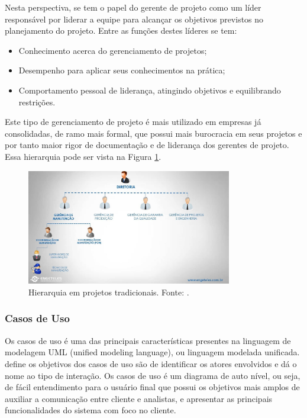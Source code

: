 Nesta perspectiva, se tem o papel do gerente de projeto como um líder responsável por liderar a equipe para alcançar os objetivos previstos no planejamento do projeto. Entre as funções destes líderes se tem:

\begin{itemize}
    \item Conhecimento acerca do gerenciamento de projetos;
    \item Desempenho para aplicar seus conhecimentos na prática;
    \item Comportamento pessoal de liderança, atingindo objetivos e equilibrando restrições.
\end{itemize}

Este tipo de gerenciamento de projeto é mais utilizado em empresas já consolidadas, de ramo mais formal, que possui mais burocracia em seus projetos e por tanto maior rigor de documentação e de liderança dos gerentes de projeto. Essa hierarquia pode ser vista na Figura \ref{img:gerencia_de_projetos_tradicional}.

\begin{figure}[H]
	\centering
	\includegraphics[width=0.8\textwidth]{figuras/gerencia_de_projeto.jpg}
	\caption{Hierarquia em projetos tradicionais. Fonte: \cite{gerentes_tradicionais}.}
	\label{img:gerencia_de_projetos_tradicional}
\end{figure}

\subsubsection{Casos de Uso}
\label{sec:casos_de_uso}

Os casos de uso é uma das principais características presentes na linguagem de modelagem UML (unified modeling language), ou linguagem modelada unificada. \cite{sommerville} define os objetivos dos casos de uso são de identificar os atores envolvidos e dá o nome ao tipo de interação. Os casos de uso é um diagrama de auto nível, ou seja, de fácil entendimento para o usuário final que possui os objetivos mais amplos de auxiliar a comunicação entre cliente e analistas, e apresentar as principais funcionalidades do sistema com foco no cliente.

